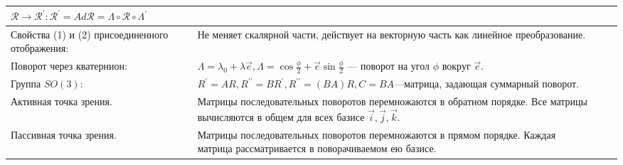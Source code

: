 \documentclass{article}
\begin{document}
\begin{tabular}{ |p{3.8cm}|p{5.7cm}|p{3.8cm}|p{5.7cm}|  }
$\mathcal{R} \rightarrow \mathcal{R}^{\prime}:
\mathcal{R}^{\prime} = Ad \mathcal{R} =
\Lambda \circ \mathcal{R} \circ \Lambda^{\prime}$                            &  %
                                                                             &  %
                                                                             \\ %
\hline
Свойства (1) и (2) присоединенного отображения:                              &  %
Не меняет скалярной части,
 действует на векторную часть как линейное преобразование.                   &  %
                                                                             &  %
                                                                             \\ %
\hline
Поворот через кватернион:                                                    &  %
$\Lambda = \lambda_0 + \lambda \vec{e},
\Lambda = \cos{\frac{\phi}{2}} + \vec{e} \sin{\frac{\phi}{2}}$ ---
поворот на угол $\phi$ вокруг $\vec{e}$.                                     &  %
                                                                             &  %
                                                                             \\ %
\hline
Группа $SO(3)$:                                                              &  %
$R^\prime = A R, R^{\prime\prime} = B R^\prime, R^{\prime\prime} = (BA) R,
C = BA$---матрица, задающая суммарный поворот.                               &  %
                                                                             &  %
                                                                             \\ %
\hline
Активная точка зрения.                                                       &  %
Матрицы последовательных поворотов перемножаются в обратном порядке.
Все матрицы вычисляются в общем для всех базисе $\vec{i}, \vec{j}, \vec{k}$. &  %
                                                                             &  %
                                                                             \\ %
\hline
Пассивная точка зрения.                                                      &  %
Матрицы последовательных поворотов перемножаются в прямом порядке.
Каждая матрица рассматривается в поворачиваемом ею базисе.                   &  %
                                                                             &  %

\end{tabular}
\end{document}
